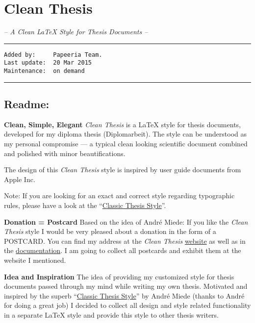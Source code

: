 \documentclass[]{article}
\date{}
\begin{document}
\section{Clean Thesis}\label{clean-thesis}

\emph{-- A Clean LaTeX Style for Thesis Documents --}

\begin{center}\rule{0.5\linewidth}{\linethickness}\end{center}

\begin{verbatim}
Added by:     Papeeria Team.
Last update:  20 Mar 2015
Maintenance:  on demand
\end{verbatim}

\begin{center}\rule{0.5\linewidth}{\linethickness}\end{center}

\subsection{Readme:}\label{readme}

\textbf{Clean, Simple, Elegant} \emph{Clean Thesis} is a LaTeX style for
thesis documents, developed for my diploma thesis (Diplomarbeit). The
style can be understood as my personal compromise --- a typical clean
looking scientific document combined and polished with minor
beautifications.

The design of this \emph{Clean Thesis} style is inspired by user guide
documents from Apple Inc.

Note: If you are looking for an exact and correct style regarding
typographic rules, please have a look at the
``\href{see\%20http://www.miede.de/\#classicthesis}{Classic Thesis
Style}''.

\textbf{Donation = Postcard} Based on the idea of André Miede: If you
like the \emph{Clean Thesis} style I would be very pleased about a
donation in the form of a POSTCARD. You can find my address at the
\emph{Clean Thesis} \href{http://cleanthesis.der-ric.de/}{website} as
well as in the \href{Clean-Thesis.pdf}{documentation}. I am going to
collect all postcards and exhibit them at the website I mentioned.

\textbf{Idea and Inspiration} The idea of providing my customized style
for thesis documents passed through my mind while writing my own thesis.
Motivated and inspired by the superb
``\href{see\%20http://www.miede.de/\#classicthesis}{Classic Thesis
Style}'' by André Miede (thanks to André for doing a great job) I
decided to collect all design and style related functionality in a
separate LaTeX style and provide this style to other thesis writers.
\end{document}
